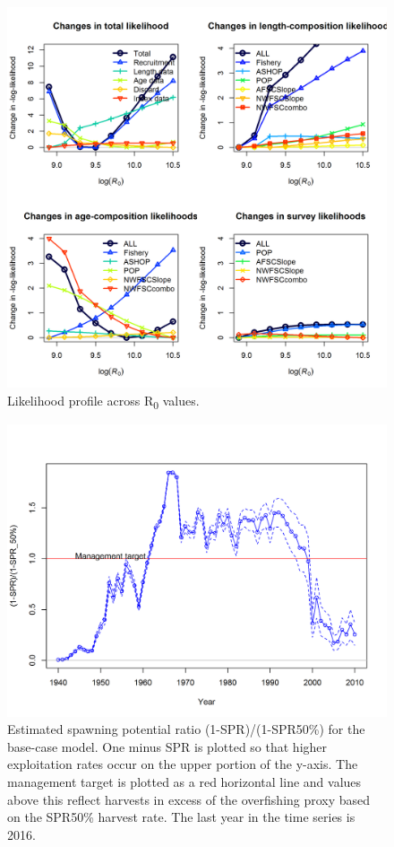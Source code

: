 \documentclass[12pt,]{article}
\begin{document}
\FloatBarrier

\begin{figure}
\centering
\includegraphics{Figures/piner_panel_R0.png}
\caption{Likelihood profile across R\textsubscript{0} values.
\label{fig:piner_R0}}
\end{figure}

\FloatBarrier

\begin{figure}
\centering
\includegraphics{r4ss/plots_mod1/SPR3_ratiointerval.png}
\caption{Estimated spawning potential ratio (1-SPR)/(1-SPR50\%) for the
base-case model. One minus SPR is plotted so that higher exploitation
rates occur on the upper portion of the y-axis. The management target is
plotted as a red horizontal line and values above this reflect harvests
in excess of the overfishing proxy based on the SPR50\% harvest rate.
The last year in the time series is 2016. \label{fig:SPR}}
\end{figure}
\end{document}
